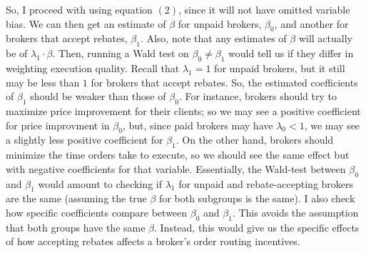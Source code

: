 \documentclass[12pt,a4paper]{article}
\begin{document}
	So, I proceed with using equation $(2)$, since it will not have omitted variable bias. We can then get an estimate of $\beta$ for unpaid brokers, $\beta_0$, and another for brokers that accept rebates, $\beta_1$. Also, note that any estimates of $\beta$ will actually be of $\lambda_1 \cdot \beta$. Then, running a Wald test on $\beta_0 \neq \beta_1$ would tell us if they differ in weighting execution quality. Recall that $\lambda_1 = 1$ for unpaid brokers, but it still may be less than $1$ for brokers that accept rebates. So, the estimated coefficients of $\beta_1$ should be weaker than those of $\beta_0$. For instance, brokers should try to maximize price improvement for their clients; so we may see a positive coefficient for price improvment in $\beta_0$, but, since paid brokers may have $\lambda_0 < 1$, we may see a slightly less positive coefficient for $\beta_1$. On the other hand, brokers should minimize the time orders take to execute, so we should see the same effect but with negative coefficients for that variable. Essentially, the Wald-test between $\beta_0$ and $\beta_1$ would amount to checking if $\lambda_1$ for unpaid and rebate-accepting brokers are the same (assuming the true $\beta$ for both subgroups is the same). I also check how specific coefficients compare between $\beta_0$ and $\beta_1$. This avoids the assumption that both groups have the same $\beta$. Instead, this would give us the specific effects of how accepting rebates affects a broker's order routing incentives. 
	
\end{document}

